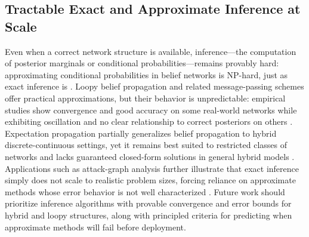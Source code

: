 \subsection{Tractable Exact and Approximate Inference at Scale}
Even when a correct network structure is available, inference---the computation of posterior marginals or conditional probabilities---remains provably hard: approximating conditional probabilities in belief networks is NP-hard, just as exact inference is \cite{dagum1993approximating}. Loopy belief propagation and related message-passing schemes offer practical approximations, but their behavior is unpredictable: empirical studies show convergence and good accuracy on some real-world networks while exhibiting oscillation and no clear relationship to correct posteriors on others \cite{murphy2013loopy}. Expectation propagation partially generalizes belief propagation to hybrid discrete-continuous settings, yet it remains best suited to restricted classes of networks and lacks guaranteed closed-form solutions in general hybrid models \cite{minka2013expectation,salmeron2018review}. Applications such as attack-graph analysis further illustrate that exact inference simply does not scale to realistic problem sizes, forcing reliance on approximate methods whose error behavior is not well characterized \cite{munozgonzalez2017efficient,gogate2012approximate}. Future work should prioritize inference algorithms with provable convergence and error bounds for hybrid and loopy structures, along with principled criteria for predicting when approximate methods will fail before deployment.

